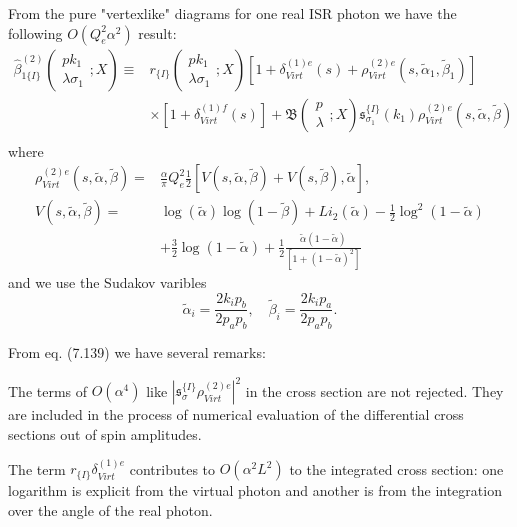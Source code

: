 From the pure "vertexlike" diagrams for one real ISR photon we have the following $O(Q_e^2\alpha^2)$ result:
\begin{align}
\hat{\beta}^{(2)}_{1\{I\}}\left(\begin{array}{c}
pk_1\\\lambda\sigma_1
\end{array};X\right)\equiv& r_{\{I\}}\left(\begin{array}{c}
pk_1\\\lambda\sigma_1
\end{array};X\right)[1+\delta_{Virt}^{(1)e}(s)+\rho_{Virt}^{(2)e}(s,\widetilde{\alpha}_1,\widetilde{\beta}_1)]\nonumber\\
&\times[1+\delta_{Virt}^{(1)f}(s)]+\mathfrak{B}\left(\begin{array}{c}
p\\\lambda
\end{array};X\right)\mathfrak{s}^{\{I\}}_{\sigma_1}(k_1)\rho_{Virt}^{(2)e}(s,\widetilde{\alpha},\widetilde{\beta})\nonumber\\
\end{align}
where
\begin{align}
\rho_{Virt}^{(2)e}(s,\widetilde{\alpha},\widetilde{\beta})=&\frac{\alpha}{\pi}Q^2_e\frac{1}{2}[V(s,\widetilde{\alpha},\widetilde{\beta})+V(s,\widetilde{\beta}),\widetilde{\alpha}],\nonumber\\
V(s,\widetilde{\alpha},\widetilde{\beta})=&\log(\widetilde{\alpha})\log(1-\widetilde{\beta})+Li_2(\widetilde{\alpha})-\frac{1}{2}\log^2(1-\widetilde{\alpha})\nonumber\\
&+\frac{3}{2}\log(1-\widetilde{\alpha})+\frac{1}{2}\frac{\widetilde{\alpha}(1-\widetilde{\alpha})}{[1+(1-\widetilde{\alpha})^2]}
\end{align}
and we use the Sudakov varibles
\begin{equation}
\widetilde{\alpha}_i=\frac{2k_ip_b}{2p_ap_b},\quad\widetilde{\beta}_i=\frac{2k_ip_a}{2p_ap_b}.
\end{equation}

From eq. (7.139) we have several remarks:

The terms of $O(\alpha^4)$ like $|\mathfrak{s}_\sigma^{\{I\}}\rho_{Virt}^{(2)e}|^2$ in the cross section are not rejected. They are included in the process of numerical evaluation of the differential cross sections out of spin amplitudes.

The term $r_{\{I\}}\delta_{Virt}^{(1)e}$ contributes to $O(\alpha^2L^2)$ to the integrated cross section: one logarithm is explicit from the virtual photon and another is from the integration over the angle of the real photon.

